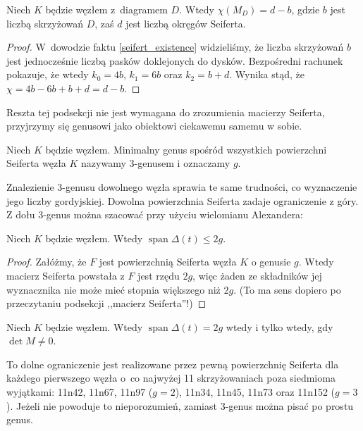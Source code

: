 \begin{proposition}
    Niech $K$ będzie węzłem z~diagramem $D$.
    Wtedy $\chi(M_D) = d - b$, gdzie $b$ jest liczbą skrzyżowań $D$, zaś $d$ jest liczbą okręgów Seiferta.
\end{proposition}

\begin{proof}
    W~dowodzie faktu \ref{seifert_existence} widzieliśmy, że liczba skrzyżowań $b$ jest jednocześnie liczbą pasków doklejonych do dysków.
    Bezpośredni rachunek pokazuje, że wtedy $k_0 = 4b$, $k_1 = 6b$ oraz $k_2 = b+d$.
    Wynika stąd, że $\chi = 4b - 6b + b + d = d - b$.
\end{proof}

Reszta tej podsekcji nie jest wymagana do zrozumienia macierzy Seiferta, przyjrzymy się genusowi jako obiektowi ciekawemu samemu w sobie.

\begin{definition}[3-genus]
    Niech $K$ będzie węzłem.
    Minimalny genus spośród wszystkich powierzchni Seiferta węzła $K$ nazywamy 3-genusem i oznaczamy $g$.
\end{definition}

Znalezienie 3-genusu dowolnego węzła sprawia te same trudności, co wyznaczenie jego liczby gordyjskiej.
Dowolna powierzchnia Seiferta zadaje ograniczenie z góry.
Z dołu 3-genus można szacować przy użyciu wielomianu Alexandera:

\begin{proposition}
    Niech $K$ będzie węzłem.
    Wtedy $\operatorname{span} \Delta(t) \le 2g$.
\end{proposition}

\begin{proof}
    Załóżmy, że $F$ jest powierzchnią Seiferta węzła $K$ o genusie $g$.
    Wtedy macierz Seiferta powstała z $F$ jest rzędu $2g$, więc żaden ze składników jej wyznacznika nie może mieć stopnia większego niż $2g$.
    (To ma sens dopiero po przeczytaniu podsekcji ,,macierz Seiferta''!)
\end{proof}

\begin{proposition}
    Niech $K$ będzie węzłem.
    Wtedy $\operatorname{span} \Delta(t) = 2g$ wtedy i tylko wtedy, gdy $\det M \neq 0$.
\end{proposition}

To dolne ograniczenie jest realizowane przez pewną powierzchnię Seiferta dla każdego pierwszego węzła o~co najwyżej 11 skrzyżowaniach poza siedmioma wyjątkami: 11n42, 11n67, 11n97 ($g = 2$), 11n34, 11n45, 11n73 oraz 11n152 ($g=3$).
Jeżeli nie powoduje to nieporozumień, zamiast 3-genus można pisać po prostu genus.

